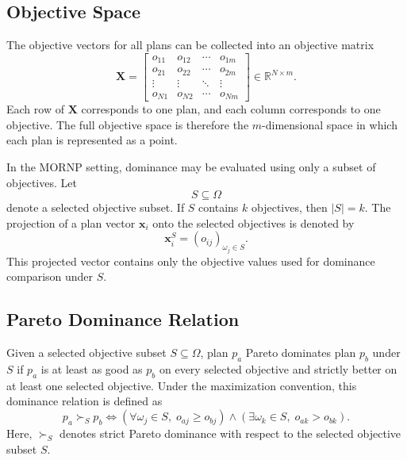 \subsection{Objective Space}
\label{subsec:objective_space}

The objective vectors for all plans can be collected into an objective matrix
\begin{equation}
    \mathbf{X}
    =
    \begin{bmatrix}
        o_{11} & o_{12} & \cdots & o_{1m} \\
        o_{21} & o_{22} & \cdots & o_{2m} \\
        \vdots & \vdots & \ddots & \vdots \\
        o_{N1} & o_{N2} & \cdots & o_{Nm}
    \end{bmatrix}
    \in \mathbb{R}^{N \times m}.
    \label{eq:objective_matrix}
\end{equation}
Each row of $\mathbf{X}$ corresponds to one plan, and each column corresponds to one objective. The full objective space is therefore the $m$-dimensional space in which each plan is represented as a point.

In the MORNP setting, dominance may be evaluated using only a subset of objectives. Let
\begin{equation}
    S \subseteq \Omega
    \label{eq:selected_objective_subset}
\end{equation}
denote a selected objective subset. If $S$ contains $k$ objectives, then $|S|=k$. The projection of a plan vector $\mathbf{x}_i$ onto the selected objectives is denoted by
\begin{equation}
    \mathbf{x}_i^{S} = (o_{ij})_{\omega_j \in S}.
    \label{eq:selected_projection}
\end{equation}
This projected vector contains only the objective values used for dominance comparison under $S$.

\subsection{Pareto Dominance Relation}
\label{subsec:pareto_dominance}

Given a selected objective subset $S \subseteq \Omega$, plan $p_a$ Pareto dominates plan $p_b$ under $S$ if $p_a$ is at least as good as $p_b$ on every selected objective and strictly better on at least one selected objective. Under the maximization convention, this dominance relation is defined as
\begin{equation}
    p_a \succ_S p_b
    \iff
    \left(
    \forall \omega_j \in S,\; o_{aj} \geq o_{bj}
    \right)
    \land
    \left(
    \exists \omega_k \in S,\; o_{ak} > o_{bk}
    \right).
    \label{eq:pareto_dominance}
\end{equation}
Here, $\succ_S$ denotes strict Pareto dominance with respect to the selected objective subset $S$.

